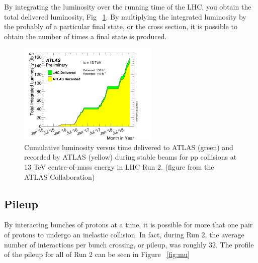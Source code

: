 \indent By integrating the luminosity over the running time of the LHC, you obtain the total delivered luminosity, Fig ~\ref{fig:lumi}. By multiplying the integrated luminosity by the probably of a particular final state, or the cross section, it is possible to obtain the number of times a final state is produced.\linebreak

\begin{figure}[H]
\begin{center}
\includegraphics*[width=0.60\textwidth] {figures/intlumivstimeRun2}%
\caption[Integrated Lumi]{Cumulative luminosity versus time delivered to ATLAS (green) and recorded by ATLAS (yellow) during stable beams for pp collisions at 13 TeV centre-of-mass energy in LHC Run 2.  (figure from the ATLAS Collaboration)}
\label{fig:lumi}
\end{center}
\end{figure}

\subsection{Pileup}
\indent By interacting bunches of protons at a time, it is possible for more that one pair of protons to undergo an inelastic collision. In fact, during Run 2,  the average number of interactions per bunch crossing, or pileup, was roughly 32. The profile of the pileup for all of Run 2 can be seen in Figure ~\ref{fig:mu} 


